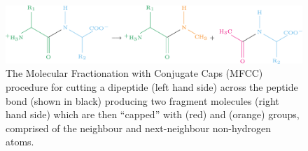 \documentclass[preprint,dvipsnames]{iucr}              %
\begin{document}
%         
%   

\begin{figure}
 \centering
 \includegraphics[width=0.8\linewidth]{MFCC.png}
 
 \caption{The Molecular Fractionation with Conjugate Caps (MFCC) 
 procedure for cutting a dipeptide (left hand side) across the 
 peptide bond (shown in black) producing two fragment molecules 
 (right hand side) which are then ``capped'' with 
 (\textcolor{RubineRed}{red}) and  (\textcolor{BurntOrange}{orange}) 
 groups, comprised of the neighbour and next-neighbour non-hydrogen atoms. }
 \label{fig_fragmentation}
 
\end{figure}
\end{document}
